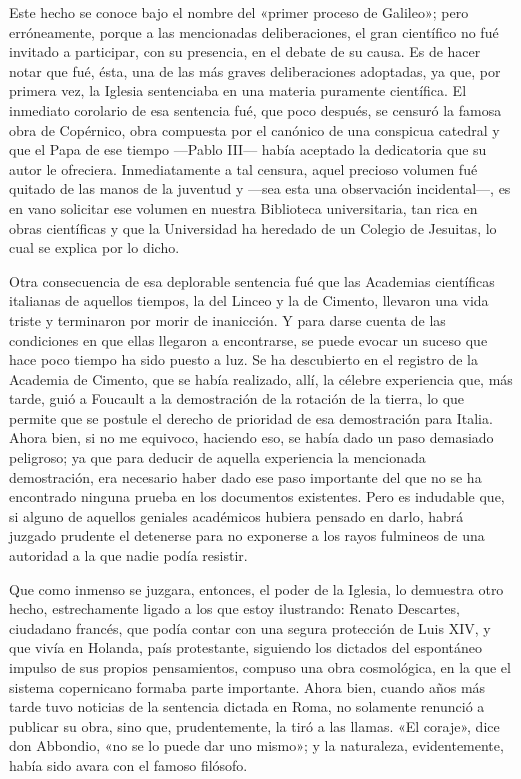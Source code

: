 \documentclass[a4paper, 12pt, draft]{article}
\begin{document}
{Este hecho se conoce bajo el nombre del «primer proceso de Galileo»; pero erróneamente, porque a las mencionadas deliberaciones, el gran científico no fué invitado a participar, con su presencia, en el debate de su causa. Es de hacer notar que fué, ésta, una de las más graves deliberaciones adoptadas, ya que, por primera vez, la Iglesia sentenciaba en una materia puramente científica. El inmediato corolario de esa sentencia fué, que poco después, se censuró la famosa obra de Copérnico, obra compuesta por el canónico de una conspicua catedral y que el Papa de ese tiempo ---Pablo III--- había aceptado la dedicatoria que su autor le ofreciera. Inmediatamente
a tal censura, aquel precioso volumen fué quitado de las manos de la juventud y ---sea esta una observación incidental---, es en vano solicitar ese volumen en nuestra Biblioteca universitaria, tan rica en obras científicas y que la Universidad ha heredado de un Colegio de Jesuitas, lo cual se explica por lo dicho.

Otra consecuencia de esa deplorable sentencia fué que las Academias científicas italianas de aquellos tiempos, la del Linceo y la de Cimento, llevaron una vida triste y terminaron por morir de inanicción. Y para darse cuenta de las condiciones en que ellas llegaron a encontrarse, se puede evocar un suceso que hace poco tiempo ha sido puesto a luz. Se ha descubierto en el registro de la Academia de Cimento, que se había realizado, allí, la célebre experiencia que, más tarde, guió a Foucault a la demostración de la rotación de la tierra, lo que permite que se postule el derecho de prioridad de esa demostración para Italia. Ahora bien, si no me equivoco, haciendo eso, se había dado un paso demasiado peligroso; ya que para deducir de aquella experiencia la mencionada demostración, era necesario haber dado ese paso importante del que no se ha encontrado ninguna prueba en los documentos existentes. Pero es indudable que, si alguno de aquellos geniales académicos hubiera pensado en darlo, habrá juzgado prudente el detenerse para no exponerse a los rayos fulmineos de una autoridad a la que nadie podía resistir.


Que como inmenso se juzgara, entonces, el poder de la Iglesia, lo demuestra otro hecho, estrechamente ligado a los que estoy ilustrando: Renato Descartes, ciudadano francés, que podía contar con una segura protección de Luis XIV, y que vivía en Holanda, país protestante, siguiendo los dictados del espontáneo impulso de sus propios pensamientos, compuso una obra cosmológica, en la que el sistema copernicano formaba parte importante. Ahora bien, cuando años más tarde tuvo noticias de la sentencia dictada en Roma, no solamente renunció a publicar su obra, sino que, prudentemente, la tiró a las llamas. «El coraje», dice don Abbondio, «no se lo puede dar uno mismo»; y la naturaleza, evidentemente, había sido avara con el famoso filósofo.

}
\end{document}

